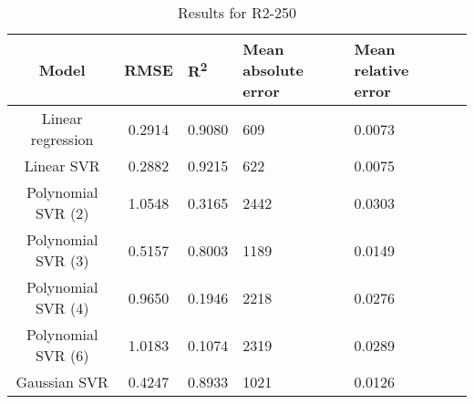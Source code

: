 \begin{table}[H]
\centering
\begin{adjustbox}{center}
\begin{tabular}{c | c M{1.2cm} M{2.5cm} M{2.5cm} M{1.8cm}}
Model & RMSE & R\textsuperscript{2} & Mean absolute error & Mean relative error \tabularnewline
\hline
Linear regression & 0.2914 & 0.9080 &    609 & 0.0073 \\
Linear SVR & 0.2882 & 0.9215 &    622 & 0.0075 \\
Polynomial SVR (2) & 1.0548 & 0.3165 &   2442 & 0.0303 \\
Polynomial SVR (3) & 0.5157 & 0.8003 &   1189 & 0.0149 \\
Polynomial SVR (4) & 0.9650 & 0.1946 &   2218 & 0.0276 \\
Polynomial SVR (6) & 1.0183 & 0.1074 &   2319 & 0.0289 \\
Gaussian SVR & 0.4247 & 0.8933 &   1021 & 0.0126 \\
\end{tabular}
\end{adjustbox}
\\
\caption{Results for R2-250}
\label{tab:coreonly_linear_R2_250}
\end{table}
